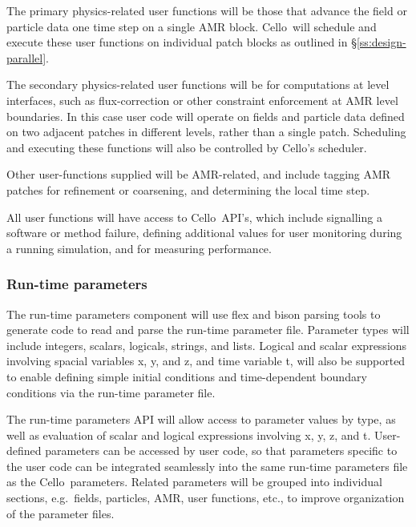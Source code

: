 \documentclass[11pt,letterpaper]{article}
\newcommand{\cello}{\textsf{Cello}}
\newcommand{\code}[1]{\textsf{#1}}
\begin{document}
The primary physics-related user functions will be those that advance
the field or particle data one time step on a single AMR block.
\cello\ will schedule and execute these user functions on individual
patch blocks as outlined in \S\ref{ss:design-parallel}.

The secondary physics-related user functions will be for computations
at level interfaces, such as flux-correction or other constraint
enforcement at AMR level boundaries.  In this case user code will
operate on fields and particle data defined on two adjacent patches in
different levels, rather than a single patch.  Scheduling and
executing these functions will also be controlled by \cello's scheduler.

Other user-functions supplied will be AMR-related, and include tagging
AMR patches for refinement or coarsening, and determining the local
time step.

All user functions will have access to \cello\ API's, which include
signalling a software or method failure, defining additional
values for user monitoring during a running simulation, and for
measuring performance.

\subsubsection{Run-time parameters} \label{sss:design-parameters}

The run-time parameters component will use \code{flex} and
\code{bison} parsing tools to generate code to read and parse the
run-time parameter file.  Parameter types will include integers,
scalars, logicals, strings, and lists.  Logical and scalar expressions
involving spacial variables \code{x}, \code{y}, and \code{z}, and time
variable \code{t}, will also be supported to enable defining simple
initial conditions and time-dependent boundary conditions via the
run-time parameter file.

The run-time parameters API will allow access to parameter values by
type, as well as evaluation of scalar and logical expressions
involving \code{x}, \code{y}, \code{z}, and \code{t}.  User-defined
parameters can be accessed by user code, so that parameters specific
to the user code can be integrated seamlessly into the same run-time
parameters file as the \cello\ parameters.  Related parameters will be
grouped into individual sections, e.g.~fields, particles, AMR, user
functions, etc., to improve organization of the parameter files.
\end{document}
